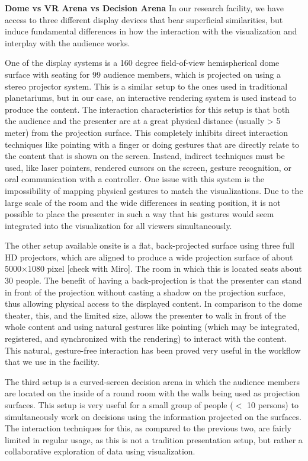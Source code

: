 \documentclass[review,journal]{vgtc}         %
\begin{document}
\noindent \textbf{Dome vs VR Arena vs Decision Arena} In our research facility, we have access to three different display devices that bear superficial similarities, but induce fundamental differences in how the interaction with the visualization and interplay with the audience works.

One of the display systems is a 160 degree field-of-view hemispherical dome surface with seating for 99 audience members, which is projected on using a stereo projector system.
This is a similar setup to the ones used in traditional planetariums, but in our case, an interactive rendering system is used instead to produce the content.
The interaction characteristics for this setup is that both the audience and the presenter are at a great physical distance (usually > 5 meter) from the projection surface.
This completely inhibits direct interaction techniques like pointing with a finger or doing gestures that are directly relate to the content that is shown on the screen.
Instead, indirect techniques must be used, like laser pointers, rendered cursors on the screen, gesture recognition, or oral communication with a controller.
One issue with this system is the impossibility of mapping physical gestures to match the visualizations.
Due to the large scale of the room and the wide differences in seating position, it is not possible to place the presenter in such a way that his gestures would seem integrated into the visualization for all viewers simultaneously.

The other setup available onsite is a flat, back-projected surface using three full HD projectors, which are aligned to produce a wide projection surface of about 5000$\times$1080 pixel [check with Miro].
The room in which this is located seats about 30 people.
The benefit of having a back-projection is that the presenter can stand in front of the projection without casting a shadow on the projection surface, thus allowing physical access to the displayed content.
In comparison to the dome theater, this, and the limited size, allows the presenter to walk in front of the whole content and using natural gestures like pointing (which may be integrated, registered, and synchronized with the rendering) to interact with the content.
This natural, gesture-free interaction has been proved very useful in the workflow that we use in the facility.

The third setup is a curved-screen decision arena in which the audience members are located on the inside of a round room with the walls being used as projection surfaces.
This setup is very useful for a small group of people ($<$ 10 persons) to simultaneously work on decisions using the information projected on the surfaces.
The interaction techniques for this, as compared to the previous two, are fairly limited in regular usage, as this is not a tradition presentation setup, but rather a collaborative exploration of data using visualization.
\end{document}
